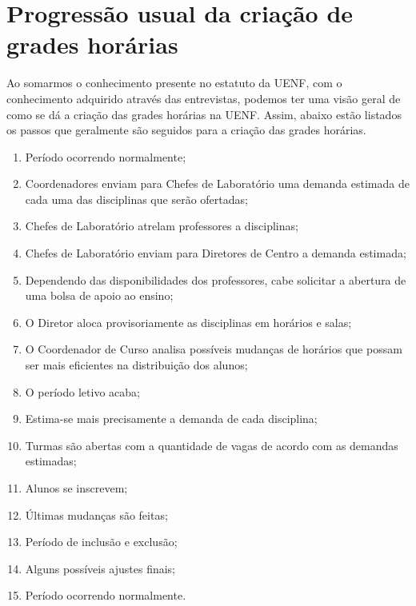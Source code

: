 \section{Progressão usual da criação de grades horárias} %


Ao somarmos o conhecimento presente no estatuto da UENF, com o conhecimento adquirido através das entrevistas, podemos ter uma visão geral de como se dá a criação das grades horárias na UENF. Assim, abaixo estão listados os passos que geralmente são seguidos para a criação das grades horárias.


\begin{enumerate}
    \item Período ocorrendo normalmente;
    \item Coordenadores enviam para Chefes de Laboratório uma demanda estimada de cada uma das disciplinas que serão ofertadas;
    \item Chefes de Laboratório atrelam professores a disciplinas;
    \item Chefes de Laboratório enviam para Diretores de Centro a demanda estimada;
    \item Dependendo das disponibilidades dos professores, cabe solicitar a abertura de uma bolsa de apoio ao ensino;
    \item O Diretor aloca provisoriamente as disciplinas em horários e salas;
    \item O Coordenador de Curso analisa possíveis mudanças de horários que possam ser mais eficientes na distribuição dos alunos;
    \item O período letivo acaba;
    \item Estima-se mais precisamente a demanda de cada disciplina;
    \item Turmas são abertas com a quantidade de vagas de acordo com as demandas estimadas;
    \item Alunos se inscrevem;
    \item Últimas mudanças são feitas;
    \item Período de inclusão e exclusão;
    \item Alguns possíveis ajustes finais;
    \item Período ocorrendo normalmente.
\end{enumerate}

